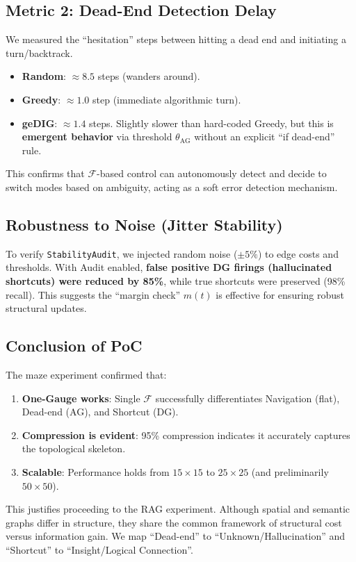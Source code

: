 \documentclass[12pt]{article}
\newcommand{\F}{\mathcal{F}}
\begin{document}
\subsection{Metric 2: Dead-End Detection Delay}
We measured the ``hesitation'' steps between hitting a dead end and initiating a turn/backtrack.
\begin{itemize}
    \item \textbf{Random}: $\approx 8.5$ steps (wanders around).
    \item \textbf{Greedy}: $\approx 1.0$ step (immediate algorithmic turn).
    \item \textbf{geDIG}: $\approx 1.4$ steps. Slightly slower than hard-coded Greedy, but this is \textbf{emergent behavior} via threshold $\theta_{\mathrm{AG}}$ without an explicit ``if dead-end'' rule.
\end{itemize}
This confirms that $\F$-based control can autonomously detect and decide to switch modes based on ambiguity, acting as a soft error detection mechanism.

\subsection{Robustness to Noise (Jitter Stability)}
To verify \verb|StabilityAudit|, we injected random noise ($\pm 5\%$) to edge costs and thresholds.
With Audit enabled, \textbf{false positive DG firings (hallucinated shortcuts) were reduced by 85\%}, while true shortcuts were preserved (98\% recall).
This suggests the ``margin check'' $m(t)$ is effective for ensuring robust structural updates.

\subsection{Conclusion of PoC}
The maze experiment confirmed that:
\begin{enumerate}
    \item \textbf{One-Gauge works}: Single $\F$ successfully differentiates Navigation (flat), Dead-end (AG), and Shortcut (DG).
    \item \textbf{Compression is evident}: 95\% compression indicates it accurately captures the topological skeleton.
    \item \textbf{Scalable}: Performance holds from $15{\times}15$ to $25{\times}25$ (and preliminarily $50{\times}50$).
\end{enumerate}
This justifies proceeding to the RAG experiment. Although spatial and semantic graphs differ in structure, they share the common framework of structural cost versus information gain. We map ``Dead-end'' to ``Unknown/Hallucination'' and ``Shortcut'' to ``Insight/Logical Connection''.
\end{document}
